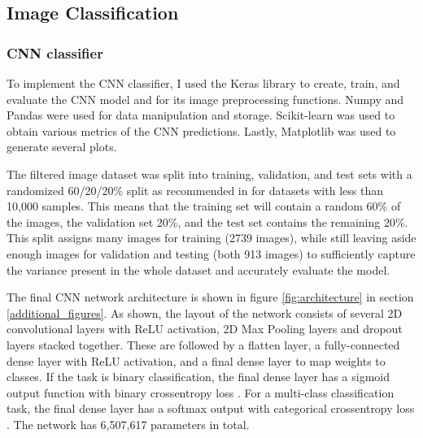 \documentclass[10pt,twocolumn,letterpaper]{article}
\begin{document}
\subsection{Image Classification}
\subsubsection{CNN classifier}
\label{CNN_Classifier_Implementation}
To implement the CNN classifier, I used the Keras \cite{chollet2015keras} library to create, train, and evaluate the CNN model and for its image preprocessing functions. Numpy \cite{numpy} and Pandas \cite{mckinney-proc-scipy-2010} were used for data manipulation and storage. Scikit-learn \cite{scikit-learn} was used to obtain various metrics of the CNN predictions. Lastly, Matplotlib \cite{Hunter:2007} was used to generate several plots.

The filtered image dataset was split into training, validation, and test sets with a randomized 60/20/20\% split as recommended in \cite{splittingsetsng} for datasets with less than 10,000 samples. This means that the training set will contain a random 60\% of the images, the validation set 20\%, and the test set contains the remaining 20\%. This split assigns many images for training (2739 images), while still leaving aside enough images for validation and testing (both 913 images) to sufficiently capture the variance present in the whole dataset and accurately evaluate the model.

The final CNN network architecture is shown in figure \ref{fig:architecture} in section \ref{additional_figures}. As shown, the layout of the network consists of several 2D convolutional layers with ReLU activation, 2D Max Pooling layers and dropout layers stacked together. These are followed by a flatten layer, a fully-connected dense layer with ReLU activation, and a final dense layer to map weights to classes. If the task is binary classification, the final dense layer has a sigmoid output function with binary crossentropy loss \cite[p.182]{goodfellow2016deep}. For a multi-class classification task, the final dense layer has a softmax output with categorical crossentropy loss \cite[p.184]{goodfellow2016deep}. The network has 6,507,617 parameters in total. 
\end{document}
